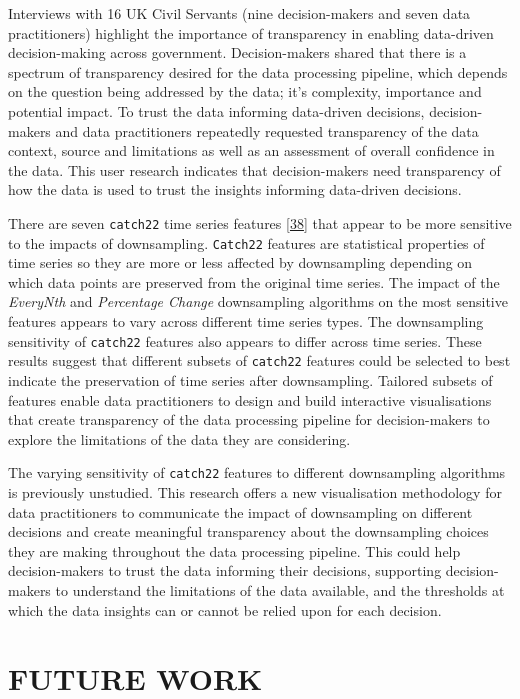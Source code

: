\documentclass{article}
\begin{document}
Interviews with 16 UK Civil Servants (nine decision-makers and seven
data practitioners) highlight the importance of transparency in enabling
data-driven decision-making across government. Decision-makers shared
that there is a spectrum of transparency desired for the data processing
pipeline, which depends on the question being addressed by the data;
it's complexity, importance and potential impact. To trust the data
informing data-driven decisions, decision-makers and data practitioners
repeatedly requested transparency of the data context, source and
limitations as well as an assessment of overall confidence in the data.
This user research indicates that decision-makers need transparency of
how the data is used to trust the insights informing data-driven
decisions.

There are seven \texttt{catch22} time series features
\protect\hyperlink{ref-catch22}{{[}38{]}} that appear to be more
sensitive to the impacts of downsampling. \texttt{Catch22} features are
statistical properties of time series so they are more or less affected
by downsampling depending on which data points are preserved from the
original time series. The impact of the \emph{EveryNth} and
\emph{Percentage Change} downsampling algorithms on the most sensitive
features appears to vary across different time series types. The
downsampling sensitivity of \texttt{catch22} features also appears to
differ across time series. These results suggest that different subsets
of \texttt{catch22} features could be selected to best indicate the
preservation of time series after downsampling. Tailored subsets of
features enable data practitioners to design and build interactive
visualisations that create transparency of the data processing pipeline
for decision-makers to explore the limitations of the data they are
considering.

The varying sensitivity of \texttt{catch22} features to different
downsampling algorithms is previously unstudied. This research offers a
new visualisation methodology for data practitioners to communicate the
impact of downsampling on different decisions and create meaningful
transparency about the downsampling choices they are making throughout
the data processing pipeline. This could help decision-makers to trust
the data informing their decisions, supporting decision-makers to
understand the limitations of the data available, and the thresholds at
which the data insights can or cannot be relied upon for each decision.

\hypertarget{future-work}{%
\section{FUTURE WORK}\label{future-work}}
\end{document}
